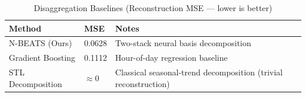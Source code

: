 \begin{table}[H]
\caption{Disaggregation Baselines (Reconstruction MSE --- lower is better)}
\begin{center}
\begin{tabular}{l l p{6cm}}
\toprule
\textbf{Method} & \textbf{MSE} & \textbf{Notes} \\
\midrule
N-BEATS (Ours) & 0.0628 & Two-stack neural basis decomposition \\
Gradient Boosting & 0.1112 & Hour-of-day regression baseline \\
STL Decomposition & $\approx 0$ & Classical seasonal-trend decomposition (trivial reconstruction) \\
\bottomrule
\end{tabular}
\end{center}
\end{table}
